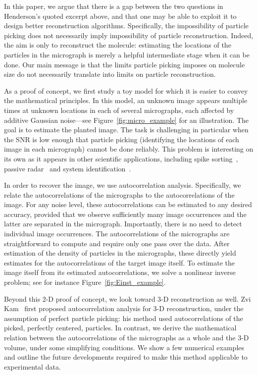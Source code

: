 \documentclass[12pt]{article}
\newcommand{\1}{\mathbf{1}}
\theoremstyle{plain}
\theoremstyle{definition}
\theoremstyle{remark}
\theoremstyle{plain}
\theoremstyle{remark}
\theoremstyle{plain}
\theoremstyle{plain}
\begin{document}
In this paper, we argue that there is a gap between the two questions in Henderson's quoted excerpt above, and that one may be able to exploit it to design better reconstruction algorithms.
Specifically, the impossibility of particle picking does not necessarily imply impossibility of particle reconstruction.
Indeed, the aim is only to reconstruct the molecule: estimating the locations of the particles in the micrograph is merely a helpful intermediate stage when it can be done. Our main message is that the limits particle picking imposes on molecule size do not necessarily  translate into limits on particle reconstruction.

As a proof of concept, we first study a toy model  for which it is easier to convey the mathematical principles. 
In this model, an unknown image appears multiple times at unknown locations in each of several micrographs, each affected by additive Gaussian noise---see Figure~\ref{fig:micro_example} for an illustration.
The goal is to estimate the planted image. The task is challenging in particular when the SNR is low enough that particle picking (identifying the locations of each image in each micrograph) cannot be done reliably. 
This problem is interesting on its own as it appears in other scientific applications, including spike sorting~\cite{lewicki1998review}, passive radar~\cite{gogineni2017passive} and system identification~\cite{ljung1998system}.

In order to recover the image, we use autocorrelation analysis. Specifically, we relate the autocorrelations of the micrographs to the autocorrelations of the image.
For any noise level, these autocorrelations can be estimated to any desired accuracy, provided that we  observe sufficiently many image occurrences and the latter are separated in the micrograph. Importantly, there is no need to detect individual image occurrences. The autocorrelations of the micrographs are straightforward to compute and require only one pass over the data. After estimation of the density of particles in the micrographs, these directly yield estimates for the autocorrelations of the target image itself. To estimate the image itself from its estimated autocorrelations, we solve a nonlinear inverse problem; see for instance Figure~\ref{fig:Einst_example}.

Beyond this 2-D proof of concept, we look toward \mbox{3-D} reconstruction as well. Zvi Kam~\cite{kam1980reconstruction} first proposed autocorrelation analysis for \mbox{3-D} reconstruction, under the assumption of perfect particle picking: his method used autocorrelations of the picked, perfectly centered, particles. In contrast, we derive the mathematical relation between the autocorrelations of the micrographs as a whole and the \mbox{3-D} volume, under some simplifying conditions.
We show a few numerical examples and outline the future developments required to make this method applicable to experimental  data. 
\end{document}
